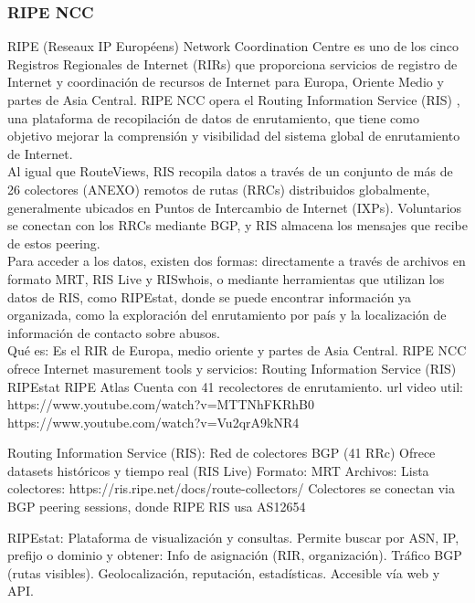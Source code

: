\subsubsection{RIPE NCC} \label{sec:anexo_ripe_ncc}

RIPE (Reseaux IP Européens) Network Coordination Centre es uno de los cinco Registros Regionales de Internet (RIRs) que proporciona servicios de registro de Internet y coordinación de recursos de Internet para Europa, Oriente Medio y partes de Asia Central.
RIPE NCC opera el Routing Information Service (RIS) \cite{RIPE-RIS}, una plataforma de recopilación de datos de enrutamiento, que tiene como objetivo mejorar la comprensión y visibilidad del sistema global de enrutamiento de Internet.\\

Al igual que RouteViews, RIS recopila datos a través de un conjunto de más de 26 colectores (ANEXO) remotos de rutas (RRCs) distribuidos globalmente, generalmente ubicados en Puntos de Intercambio de Internet (IXPs).  Voluntarios se conectan con los RRCs mediante BGP, y RIS almacena los mensajes que recibe de estos peering.\\

Para acceder a los datos, existen dos formas: directamente a través de archivos en formato MRT, RIS Live y RISwhois, o mediante herramientas que utilizan los datos de RIS, como RIPEstat, donde se puede encontrar información ya organizada, como la exploración del enrutamiento por país y la localización de información de contacto sobre abusos.\\



Qué es: Es el RIR de Europa, medio oriente y partes de Asia Central. 
RIPE NCC ofrece Internet masurement tools y servicios:
Routing Information Service (RIS)
RIPEstat
RIPE Atlas
Cuenta con 41 recolectores de enrutamiento.
url video util: https://www.youtube.com/watch?v=MTTNhFKRhB0
https://www.youtube.com/watch?v=Vu2qrA9kNR4

Routing Information Service (RIS):
Red de colectores BGP (41 RRc)
Ofrece datasets históricos y tiempo real (RIS Live)
Formato: MRT
Archivos: 
Lista colectores: https://ris.ripe.net/docs/route-collectors/
Colectores se conectan via BGP peering sessions, donde RIPE RIS usa AS12654


RIPEstat:
Plataforma de visualización y consultas.
Permite buscar por ASN, IP, prefijo o dominio y obtener:
Info de asignación (RIR, organización).
Tráfico BGP (rutas visibles).
Geolocalización, reputación, estadísticas.
Accesible vía web y API.

